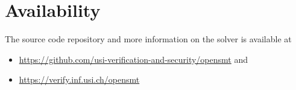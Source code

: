 \documentclass{easychair}
\begin{document}
\section{Availability}
The source code repository and more information on the solver is
available at

\begin{itemize}
    \item \url{https://github.com/usi-verification-and-security/opensmt}
        and
    \item \url{https://verify.inf.usi.ch/opensmt}
\end{itemize}

\end{document}
